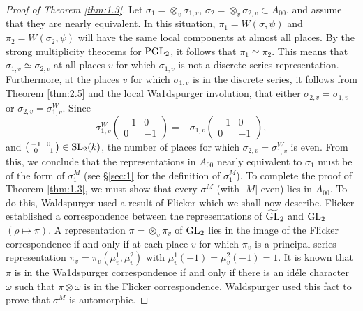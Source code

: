 \begin{proof}[Proof of Theorem \ref{thm:1.3}]
Let $\sigma_1 = \otimes_v \sigma_{1, v}$, $\sigma_2 = \otimes_v \sigma_{2, v} \subset A_{00}$, and assume that they are nearly equivalent.
In this situation, $\pi_1 = W(\sigma, \psi)$ and $\pi_2 = W(\sigma_2, \psi)$ will have the same local components at almost all places.
By the strong multiplicity theorems for $\mathrm{PGL}_2$, it follows that $\pi_1 \simeq \pi_2$.
This means that $\sigma_{1, v} \simeq \sigma_{2, v}$ at all places $v$ for which $\sigma_{1, v}$ is not a discrete series representation.
Furthermore, at the places $v$ for which $\sigma_{1, v}$ is in the discrete series, it follows from Theorem \ref{thm:2.5} and the local Wa1dspurger involution, that either $\sigma_{2, v} = \sigma_{1, v}$ or $\sigma_{2, v} = \sigma_{1, v}^W$.
Since
\[
\sigma_{1, v}^W \begin{pmatrix}
    -1 & 0 \\ 0 & -1
\end{pmatrix} = -\sigma_{1, v}\begin{pmatrix}
    -1 & 0 \\ 0 & -1
\end{pmatrix},
\]
and $\left(\begin{smallmatrix}
    -1 & 0\\0&-1
\end{smallmatrix}\right) \in \mathrm{SL}_2(k)$, the number of places for which $\sigma_{2, v} = \sigma_{1, v}^{W}$ is even.
From this, we conclude that the representations in $A_{00}$ nearly equivalent to $\sigma_1$ must be of the form of $\sigma_1^M$ (see \S \ref{sec:1} for the definition of $\sigma_1^M$).
To complete the proof of Theorem \ref{thm:1.3}, we must show that every $\sigma^M$ (with $|M|$ even) lies in $A_{00}$.
To do this, Waldspurger used a result of Flicker \cite{flicker80covering} which we shall now describe.
Flicker established a correspondence between the representations of $\widetilde{\mathrm{GL}}_2$ and $\mathrm{GL}_2$ $(\rho \mapsto \pi)$.
A representation $\pi = \otimes_v \pi_v$ of $\mathrm{GL}_2$ lies in the image of the Flicker correspondence if and only if at each place $v$ for which $\pi_v$ is a principal series representation $\pi_v = \pi_v(\mu_v^1, \mu_v^2)$ with $\mu_v^1(-1) = \mu_v^2(-1) = 1$.
It is known \cite{waldspurger91quaternion,gps81shimura} that $\pi$ is in the Wa1dspurger correspondence if and only if there is an id\'ele character $\omega$ such that $\pi \otimes \omega$ is in the Flicker correspondence.
Waldspurger used this fact to prove that $\sigma^M$ is automorphic.
\end{proof}